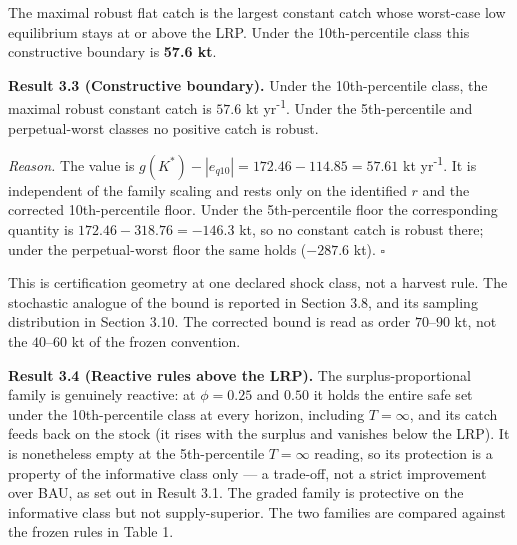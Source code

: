 \documentclass[11pt]{article}
\begin{document}
The maximal robust flat catch is the largest constant catch whose
worst-case low equilibrium stays at or above the LRP. Under the
10th-percentile class this constructive boundary is \textbf{57.6 kt}.

\textbf{Result 3.3 (Constructive boundary).} Under the 10th-percentile
class, the maximal robust constant catch is \(57.6\) kt yr\textsuperscript{-1}. Under the
5th-percentile and perpetual-worst classes no positive catch is robust.

\emph{Reason.} The value is
\(g(K^*) - |e_{q10}| = 172.46 - 114.85 = 57.61\) kt yr\textsuperscript{-1}. It is
independent of the family scaling and rests only on the identified \(r\)
and the corrected 10th-percentile floor. Under the 5th-percentile floor
the corresponding quantity is \(172.46 - 318.76 = -146.3\) kt, so no
constant catch is robust there; under the perpetual-worst floor the same
holds (\(-287.6\) kt). \ensuremath{\square}

This is certification geometry at one declared shock class, not a
harvest rule. The stochastic analogue of the bound is reported in
Section 3.8, and its sampling distribution in Section 3.10. The
corrected bound is read as order \(70\)--\(90\) kt, not the
\(40\)--\(60\) kt of the frozen convention.

\textbf{Result 3.4 (Reactive rules above the LRP).} The
surplus-proportional family is genuinely reactive: at \(\phi = 0.25\)
and \(0.50\) it holds the entire safe set under the 10th-percentile
class at every horizon, including \(T = \infty\), and its catch feeds
back on the stock (it rises with the surplus and vanishes below the
LRP). It is nonetheless empty at the 5th-percentile \(T=\infty\)
reading, so its protection is a property of the informative class only
--- a trade-off, not a strict improvement over BAU, as set out in Result
3.1. The graded family is protective on the informative class but not
supply-superior. The two families are compared against the frozen rules
in Table 1.
\end{document}
